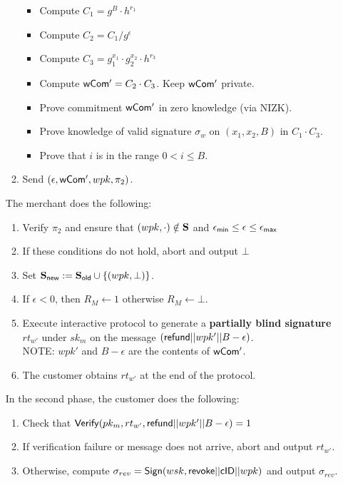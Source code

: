 \documentclass[11pt]{report}
\begin{document}
\begin{enumerate}
\begin{enumerate}
\begin{itemize}
\item Compute $C_1 = g^B \cdot h^{r_1}$
\item Compute $C_2 = C_1 / g^\epsilon$
\item Compute $C_3 = g_1^{x_1} \cdot g_2^{x_2} \cdot h^{r_3}$
\item Compute ${\sf wCom'} = C_2 \cdot C_3$. Keep ${\sf wCom'}$ private.
\item Prove commitment ${\sf wCom'}$ in zero knowledge (via {\sf NIZK}).
\item Prove knowledge of valid signature $\sigma_w$ on $(x_1, x_2, B)$ in $C_1 \cdot C_3$.
\item Prove that $i$ is in the range $0 < i \leq B$.
\end{itemize}


\item Send $(\epsilon, {\sf wCom'}, wpk, \pi_2)$.
\end{enumerate}

\medskip \noindent
The merchant does the following:
\begin{enumerate}
\item Verify $\pi_2$ and ensure that $(wpk, \cdot) \notin {\bf S}$ and $\epsilon_{\sf min} \leq \epsilon \leq \epsilon_{\sf max}$
\item If these conditions do not hold, abort and output $\bot$
\item Set ${\bf S}_{\sf new} := {\bf S}_{\sf old} \cup \{(wpk, \bot)\}$.
\item If $\epsilon < 0$, then $R_{M} \leftarrow 1$ otherwise $R_{M} \leftarrow \bot$.
\item Execute interactive protocol to generate a {\bf partially blind signature} $rt_{w'}$ under $sk_m$ on the message $({\sf refund}||wpk'||B - \epsilon)$.
\\ NOTE: $wpk'$ and $B - \epsilon$ are the contents of ${\sf wCom'}$.
\\ 
\item The customer obtains $rt_{w'}$ at the end of the protocol.
\end{enumerate}

\medskip \noindent
In the second phase, the customer does the following:
\begin{enumerate}
\item Check that ${\sf Verify}(pk_m, rt_{w'}, {\sf refund}||wpk'||B - \epsilon) = 1$
\item If verification failure or message does not arrive, abort and output $rt_{w'}$.
\item Otherwise, compute $\sigma_{rev} = {\sf Sign}(wsk, {\sf revoke}||{\sf cID}||wpk)$ and output $\sigma_{rev}$.
\end{enumerate}


\end{enumerate}
\end{document}
